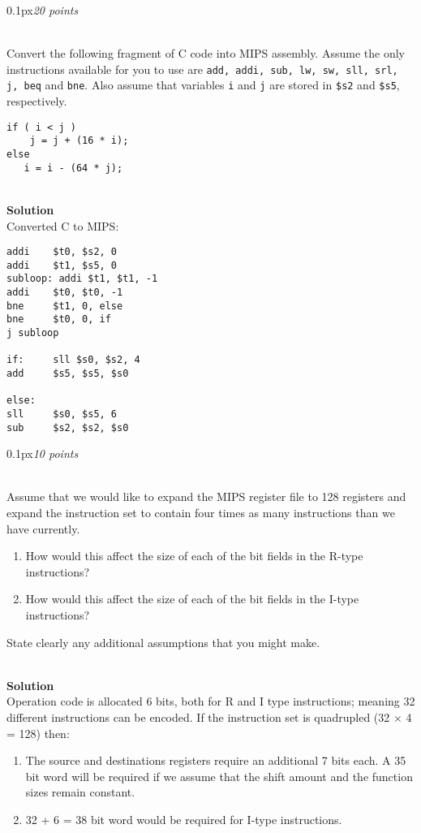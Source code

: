 \documentclass[11pt]{article}
\newcommand{\problem}[2]{\begin{adjustwidth}{0.1px}\noindent \framebox[1.2\width]{\large Problem #1}\hfill \emph{#2} \end{adjustwidth} \bigskip\\}
\newcommand{\code}[1]{{\texttt{#1}}}
\begin{document}
\newpage
\problem{4}{20 points}
Convert the following fragment of C code into MIPS assembly.  Assume the only instructions available for you to use are \code{add, addi, sub, lw, sw, sll, srl, j, beq} and \code{bne}. Also assume that variables \code{i} and \code{j} are stored in \code{\$s2} and \code{\$s5}, respectively.
\begin{lstlisting}[style=c]
if ( i < j ) 
    j = j + (16 * i);
else
   i = i - (64 * j); 
\end{lstlisting}
\bigskip \\
\textbf{Solution}\\
Converted C to MIPS:
\begin{lstlisting}[style=MIPS]
addi    $t0, $s2, 0
addi    $t1, $s5, 0
subloop: addi $t1, $t1, -1
addi    $t0, $t0, -1
bne     $t1, 0, else
bne     $t0, 0, if
j subloop

if:     sll $s0, $s2, 4
add     $s5, $s5, $s0

else:
sll     $s0, $s5, 6
sub     $s2, $s2, $s0
\end{lstlisting}






\newpage
\problem{5}{10 points}
Assume that we would like to expand the MIPS register file to 128 registers and expand the instruction set to contain four times as many instructions than we have currently.
\begin{enumerate}
    \item How would this affect the size of each of the bit fields in the R-type instructions?
    \item How would this affect the size of each of the bit fields in the I-type instructions? 
\end{enumerate}
State clearly any additional assumptions that you might make.

\bigskip \\
\textbf{Solution}\\
Operation code is allocated 6 bits, both for R and I type instructions; meaning 32 different instructions can be encoded. If the instruction set is quadrupled (32 $\times$ 4 = 128) then:
\begin{enumerate}
    \item The source and destinations registers require an additional 7 bits each. A 35 bit word will be required if we assume that the shift amount and the function sizes remain constant.
    \item 32 + 6 = 38 bit word would be required for I-type instructions.
\end{enumerate}
\end{document}
